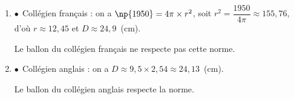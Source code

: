
\medskip

%
%
%

\medskip

\begin{enumerate}
\item %

$\bullet~~$Collégien français : on a $\np{1950} = 4\pi \times r^2$, soit $r^2  = \dfrac{1950}{4\pi}\approx 155,76$, d'où $r \approx 12,45$ et $D \approx 24,9$~(cm).

Le ballon du collégien français ne respecte pas cette norme.
\item %
$\bullet~~$Collégien anglais : on a $D \approx 9,5 \times 2,54 \approx 24,13$~(cm).

Le ballon du collégien anglais respecte la norme.
\end{enumerate}

\bigskip

